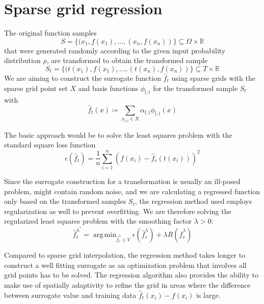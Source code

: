 \documentclass[
  a4paper,  %
  twoside,  %
  bibliography=totoc,
  headsepline,
  cleardoublepage=empty,
  parskip=half,
  draft=false
]{scrbook}
\DeclareMathOperator*{\argmin}{arg\,min}
\begin{document}
\section{Sparse grid regression}

The original function samples
\begin{equation}
S=\{(x_1, f(x_1), \dots, (x_n, f(x_n))\} \subseteq \Omega \times \mathds{R}
\end{equation}
that were generated randomly according to the given input probability distribution $\rho$, are transformed to obtain the transformed sample
\begin{equation}
S_t=\{(t(x_1), f(x_1), \dots, (t(x_n), f(x_n))\} \subseteq T \times \mathds{R}
\end{equation}
We are aiming to construct the surrogate function $\hat{f}_t$ using sparse grids with the sparse grid point set $X$ and basis functions $\phi_{\underline{l},\underline{i}}$ for the transformed sample $S_t$ with
\begin{equation}
\hat{f}_t(x) \coloneqq \sum_{x_{\underline{l},\underline{i}} \in X} \alpha_{\underline{l},\underline{i}} \phi_{\underline{l},\underline{i}}(x)
\end{equation}

The basic approach would be to solve the least squares problem with the standard square loss function
\begin{equation}
\epsilon(\hat{f}_t)=\frac{1}{n} \sum_{i=1}^n (f(x_i) - \hat{f}_r(t(x_i)))^2 
\end{equation}

Since the surrogate construction for a transformation is usually an ill-posed problem, might contain random noise, and we are calculating a regressed function only based on the transformed samples $S_t$, the regression method used employs regularization as well to prevent overfitting.
We are therefore solving the regularized least squares problem with the smoothing factor $\lambda > 0$:
\begin{equation}
\hat{f}_t^{\lambda^*} = \argmin_{\hat{f}_r^\lambda \in V} \epsilon(\hat{f}_r^\lambda) + \lambda R(\hat{f}_r^\lambda)
\end{equation}

Compared to sparse grid interpolation, the regression method takes longer to construct a well fitting surrogate as an optimization problem that involves all grid points has to be solved.
The regression algorithm also provides the ability to make use of spatially adaptivity to refine the grid in areas where the difference between surrogate value and training data $\hat{f}_t(x_i) - f(x_i)$ is large.
\end{document}
